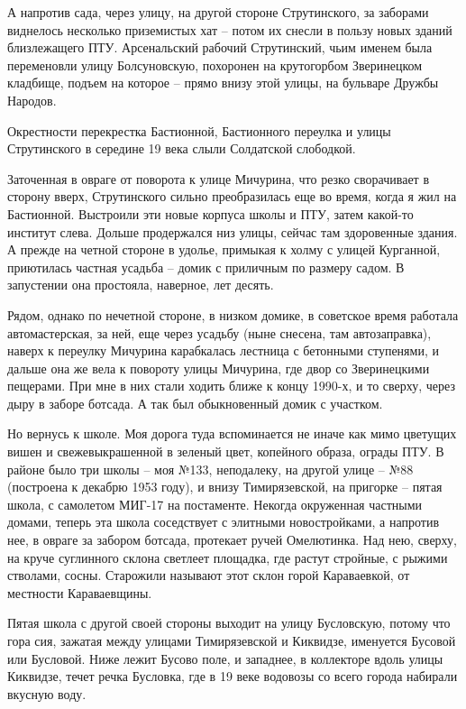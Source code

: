 А напротив сада, через улицу, на другой стороне Струтинского, за заборами виднелось несколько приземистых хат – потом их снесли в пользу новых зданий близлежащего ПТУ. Арсенальский рабочий Струтинский, чьим именем была переменовли улицу Болсуновскую, похоронен на крутогорбом Зверинецком кладбище, подъем на которое – прямо внизу этой улицы, на бульваре Дружбы Народов.

Окрестности перекрестка Бастионной, Бастионного переулка и улицы Струтинского в середине 19 века слыли Солдатской слободкой.

Заточенная в овраге от поворота к улице Мичурина, что резко сворачивает в сторону вверх, Струтинского сильно преобразилась еще во время, когда я жил на Бастионной. Выстроили эти новые корпуса школы и ПТУ, затем какой-то институт слева. Дольше продержался низ улицы, сейчас там здоровенные здания. А прежде на четной стороне в удолье, примыкая к холму с улицей Курганной, приютилась частная усадьба – домик с приличным по размеру садом. В запустении она простояла, наверное, лет десять.

Рядом, однако по нечетной стороне, в низком домике, в советское время работала автомастерская, за ней, еще через усадьбу (ныне снесена, там автозаправка), наверх к переулку Мичурина карабкалась лестница с бетонными ступенями, и дальше она же вела к повороту улицы Мичурина, где двор со Зверинецкими пещерами. При мне в них стали ходить ближе к концу 1990-х, и то сверху, через дыру в заборе ботсада. А так был обыкновенный домик с участком.

Но вернусь к школе. Моя дорога туда вспоминается не иначе как мимо цветущих вишен и свежевыкрашенной в зеленый цвет, копейного образа, ограды ПТУ. В районе было три школы – моя №133, неподалеку, на другой улице – №88 (построена к декабрю 1953 году), и внизу Тимирязевской, на пригорке – пятая школа, с самолетом МИГ-17 на постаменте. Некогда окруженная частными домами, теперь эта школа соседствует с элитными новостройками, а напротив нее, в овраге за забором ботсада, протекает ручей Омелютинка. Над нею, сверху, на круче суглинного склона светлеет площадка, где растут стройные, с рыжими стволами, сосны. Старожили называют этот склон горой Караваевкой, от местности Караваевщины.

Пятая школа с другой своей стороны выходит на улицу Бусловскую, потому что гора сия, зажатая между улицами Тимирязевской и Киквидзе, именуется Бусовой или Бусловой. Ниже лежит Бусово поле, и западнее, в коллекторе вдоль улицы Киквидзе, течет речка Бусловка, где в 19 веке водовозы со всего города набирали вкусную воду.

